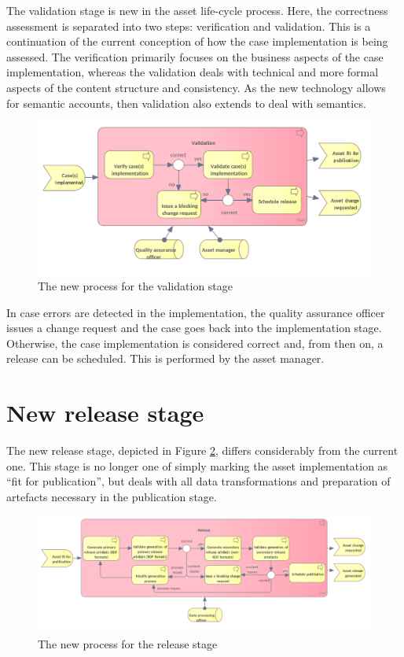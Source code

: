 	The validation stage is new in the asset life-cycle process. Here, the correctness assessment is separated into two steps: verification and validation. This is a continuation of the current conception of how the case implementation is being assessed. The verification primarily focuses on the business aspects of the case implementation, whereas the validation deals with  technical and more formal aspects of the content structure and consistency. As the new technology allows for semantic accounts, then validation also extends to deal with semantics. 	 

	\begin{figure}[h]
		\centering
		\includegraphics[width=.892\textwidth]{images/business/new/Validation.png}
		\caption{The new process for the validation stage}
		\label{fig:validation-new}
	\end{figure}

	In case errors are detected in the implementation, the quality assurance officer issues a  change request and the case goes back into the implementation stage. Otherwise, the case implementation is considered correct and, from then on, a release can be scheduled. This is performed by the asset manager. 
		
	\section{New release stage}
	\label{sec:release-new}
	
	The new release stage, depicted in Figure \ref{fig:release-new}, differs considerably from the current one. This stage is no longer one of simply marking the asset implementation as ``fit for publication'', but deals with all data transformations and preparation of artefacts necessary in the publication stage.
	
	\begin{figure}[h]
		\centering
		\includegraphics[width=1.05\textwidth]{images/business/new/Release.png}
		\caption{The new process for the release stage}
		\label{fig:release-new}
	\end{figure}

